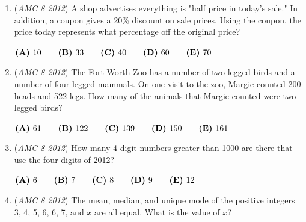 \begin{enumerate}
 $\textbf{(A)}\hspace{.05in}90\qquad\textbf{(B)}\hspace{.05in}92\qquad\textbf{(C)}\hspace{.05in}95\qquad\textbf{(D)}\hspace{.05in}96\qquad\textbf{(E)}\hspace{.05in}97$


	\item (\textit{AMC 8 2012}) A shop advertises everything is "half price in today's sale." In addition, a coupon gives a 20\% discount on sale prices. Using the coupon, the price today represents what percentage off the original price?


 $\textbf{(A)}\hspace{.05in}10\qquad\textbf{(B)}\hspace{.05in}33\qquad\textbf{(C)}\hspace{.05in}40\qquad\textbf{(D)}\hspace{.05in}60\qquad\textbf{(E)}\hspace{.05in}70$


	\item (\textit{AMC 8 2012}) The Fort Worth Zoo has a number of two-legged birds and a number of four-legged mammals. On one visit to the zoo, Margie counted 200 heads and 522 legs. How many of the animals that Margie counted were two-legged birds?


 $\textbf{(A)}\hspace{.05in}61\qquad\textbf{(B)}\hspace{.05in}122\qquad\textbf{(C)}\hspace{.05in}139\qquad\textbf{(D)}\hspace{.05in}150\qquad\textbf{(E)}\hspace{.05in}161$


	\item (\textit{AMC 8 2012}) How many 4-digit numbers greater than 1000 are there that use the four digits of 2012?


 $\textbf{(A)}\hspace{.05in}6\qquad\textbf{(B)}\hspace{.05in}7\qquad\textbf{(C)}\hspace{.05in}8\qquad\textbf{(D)}\hspace{.05in}9\qquad\textbf{(E)}\hspace{.05in}12$


	\item (\textit{AMC 8 2012}) The mean, median, and unique mode of the positive integers 3, 4, 5, 6, 6, 7, and $x$ are all equal. What is the value of $x$?



\end{enumerate}
